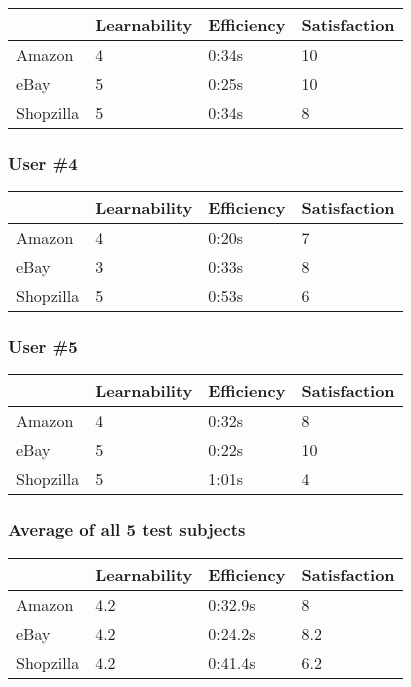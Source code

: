 \documentclass[11pt, oneside]{article}   	%
\begin{document}
\begin{tabular}{| l | l | l | l |}
    \hline
     & Learnability & Efficiency & Satisfaction \\ \hline
    Amazon & 4 & 0:34s & 10 \\ \hline
    eBay & 5 & 0:25s & 10 \\ \hline
    Shopzilla & 5 & 0:34s & 8 \\ \hline
\end{tabular}

\subsubsection{User \#4}

\begin{tabular}{| l | l | l | l |}
    \hline
     & Learnability & Efficiency & Satisfaction \\ \hline
    Amazon & 4 & 0:20s & 7 \\ \hline
    eBay & 3 & 0:33s & 8 \\ \hline
    Shopzilla & 5 & 0:53s & 6 \\\hline
\end{tabular}

\subsubsection{User \#5}

\begin{tabular}{| l | l | l | l |}
    \hline
     & Learnability & Efficiency & Satisfaction \\ \hline
    Amazon & 4 & 0:32s & 8 \\ \hline
    eBay & 5 & 0:22s & 10 \\ \hline
    Shopzilla & 5 & 1:01s & 4 \\\hline
\end{tabular}

\subsubsection{Average of all 5 test subjects}

\begin{tabular}{| l | l | l | l |}
    \hline
     & Learnability & Efficiency & Satisfaction \\ \hline
    Amazon & 4.2 & 0:32.9s & 8 \\ \hline
    eBay & 4.2 & 0:24.2s & 8.2 \\ \hline
    Shopzilla & 4.2 & 0:41.4s & 6.2 \\\hline
\end{tabular}
\end{document}

